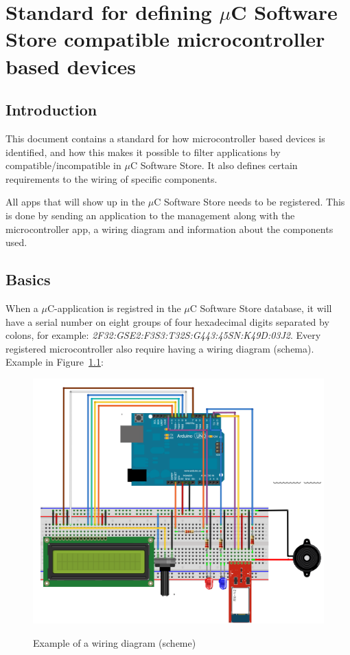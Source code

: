 \chapter{Standard for defining $\mu$C Software Store compatible microcontroller based devices}

\section{Introduction}
This document contains a standard for how microcontroller based devices is identified, and how this makes it possible to filter applications by compatible/incompatible in $\mu$C Software Store. It also defines certain requirements to the wiring of specific components.

All apps that will show up in the $\mu$C Software Store needs to be registered. This is done by sending an application to the management along with the microcontroller app, a wiring diagram and information about the components used.

\section{Basics}
When a $\mu$C-application is registred in the $\mu$C Software Store database, it will have a serial number on eight groups of four hexadecimal digits separated by colons, for example: \textit{2F32:GSE2:F3S3:T32S:G443:45SN:K49D:03J2}. Every registered microcontroller also require having a wiring diagram (schema). Example in Figure~\ref{fig:wiring_simple}:

\begin{figure}[H]
\caption{Example of a wiring diagram (scheme)}
\centering
\includegraphics[scale=0.8]{images/wiring_diagram.png}
\label{fig:wiring_simple}
\end{figure}

